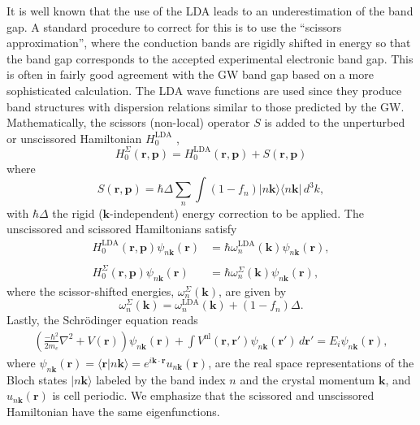 It is well known that the use of the LDA leads to an underestimation of the band
gap. A standard procedure to correct for this is to use the ``scissors
approximation'', where the conduction bands are rigidly shifted in energy so
that the band gap corresponds to the accepted experimental electronic band
gap.\cite{levinePRL89,levinePRL91,delsolePRB93} This is often in fairly good
agreement with the GW band gap based on a more sophisticated
calculation.\cite{hybertsenPRB86} The LDA wave functions are used since they
produce band structures with dispersion relations similar to those predicted by
the GW. Mathematically, the scissors (non-local) operator $S$ is added to the
unperturbed or unscissored Hamiltonian $H^{\mathrm{LDA}}_{0}$ ,
\begin{equation}\label{ache.1}
H^\Sigma_{0}(\mathbf{r},\mathbf{p})
= H^{\mathrm{LDA}}_{0}(\mathbf{r},\mathbf{p})
+ S(\mathbf{r},\mathbf{p})
\end{equation}
where 
\begin{equation}\label{hats}
S(\mathbf{r},\mathbf{p}) = \hbar \Delta\sum_{n}\int (1-f_{n})
|n\mathbf{k}\rangle\langle n\mathbf{k}|\,d^{3}k,
\end{equation}
with $\hbar\Delta$ the rigid ($\mathbf{k}$-independent) energy correction to be
applied. The unscissored and scissored Hamiltonians satisfy
\begin{align*}
H^{\mathrm{LDA}}_{0}(\mathbf{r},\mathbf{p})\psi _{n\mathbf{k}}(\mathbf{r}) &=
\hbar \omega^{\mathrm{LDA}}_{n}(\mathbf{k})\psi _{n\mathbf{k}}(\mathbf{r}),
\label{hamils} \\\\
H_{0}^\Sigma (\mathbf{r},\mathbf{p})\psi _{n\mathbf{k}}(\mathbf{r}) &=
\hbar \omega_{n}^\Sigma(\mathbf{k})\psi _{n\mathbf{k}}(\mathbf{r}),
\end{align*}
where the scissor-shifted energies, $\omega_{n}^\Sigma(\mathbf{k})$, are given
by
\begin{equation}\label{chon.78}
\omega_{n}^\Sigma(\mathbf{k})
= \omega^\mathrm{LDA}_{n}(\mathbf{k})+(1-f_{n})\Delta.
\end{equation}
Lastly, the Schr\"odinger equation reads
\begin{align}\label{ache.4} 
\left(
\frac{-\hbar^2}{2m_{e}}\nabla^{2}
+ V(\mathbf{r})
\right)
\psi_{n\mathbf{k}}(\mathbf{r})
+ \int V^{\mathrm{nl}}(\mathbf{r},\mathbf{r}')
  \psi_{n\mathbf{k}}(\mathbf{r}')\,d\mathbf{r}'
= E_{i}\psi_{n\mathbf{k}}(\mathbf{r}),
\end{align} 
where $\psi_{n\mathbf{k}}(\mathbf{r}) = \langle\mathbf{r}|n\mathbf{k}\rangle =
e^{i\mathbf{k}\cdot\mathbf{r}}u_{n\mathbf{k}}(\mathbf{r})$, are the real space
representations of the Bloch states $|n\mathbf{k}\rangle$ labeled by the band
index $n$ and the crystal momentum $\mathbf{k}$, and
$u_{n\mathbf{k}}(\mathbf{r})$ is cell periodic. We emphasize that the scissored
and unscissored Hamiltonian have the same eigenfunctions.



